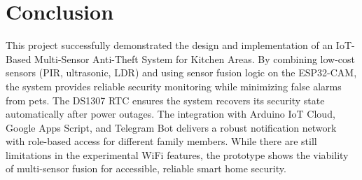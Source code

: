 \documentclass[11pt,a4paper]{report}
\begin{document}
\chapter{Conclusion}
This project successfully demonstrated the design and implementation of an IoT-Based Multi-Sensor Anti-Theft System for Kitchen Areas. By combining low-cost sensors (PIR, ultrasonic, LDR) and using sensor fusion logic on the ESP32-CAM, the system provides reliable security monitoring while minimizing false alarms from pets. The DS1307 RTC ensures the system recovers its security state automatically after power outages. 
The integration with Arduino IoT Cloud, Google Apps Script, and Telegram Bot delivers a robust notification network with role-based access for different family members. While there are still limitations in the experimental WiFi features, the prototype shows the viability of multi-sensor fusion for accessible, reliable smart home security.


\end{document}
